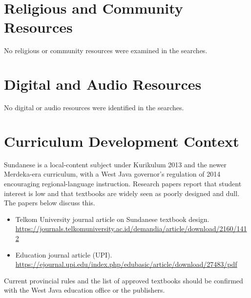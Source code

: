\documentclass[12pt]{article}
\begin{document}
\section{Religious and Community Resources}
No religious or community resources were examined in the searches.

\section{Digital and Audio Resources}
No digital or audio resources were identified in the searches.

\section{Curriculum Development Context}
Sundanese is a local-content subject under Kurikulum 2013 and the newer Merdeka-era curriculum, with a West Java governor's regulation of 2014 encouraging regional-language instruction. Research papers report that student interest is low and that textbooks are widely seen as poorly designed and dull. The papers below discuss this.
\begin{itemize}
\item Telkom University journal article on Sundanese textbook design. \url{https://journals.telkomuniversity.ac.id/demandia/article/download/2160/1412}
\item Education journal article (UPI). \url{https://ejournal.upi.edu/index.php/edubasic/article/download/27483/pdf}
\end{itemize}
Current provincial rules and the list of approved textbooks should be confirmed with the West Java education office or the publishers.
\end{document}
